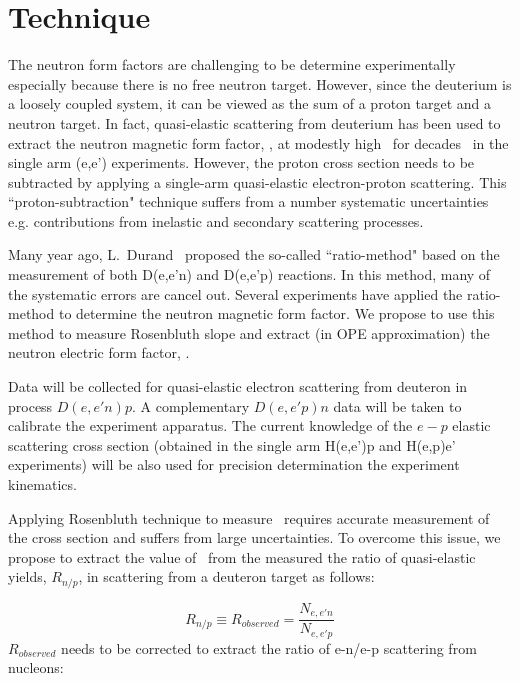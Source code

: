 \section{Technique}
%
The neutron form factors are challenging to be determine experimentally especially because there is no free neutron target. 
However, since the deuterium is a loosely coupled system, it can be viewed as the sum of a proton target and a neutron target. 
In fact, quasi-elastic scattering from deuterium has been used to extract the neutron magnetic form factor, \gmn, at modestly high \qsq~for decades~\cite{Hughes:1965zza, Arnold:1988us} in the single arm (e,e') experiments. 
However, the proton cross section needs to be subtracted by applying a single-arm quasi-elastic electron-proton scattering. 
This ``proton-subtraction" technique suffers from a number systematic uncertainties e.g. contributions from inelastic and secondary scattering processes. 

Many year ago, L.~Durand~\cite{Durand:1959zz} proposed the so-called ``ratio-method" based on the measurement of both D(e,e'n) and D(e,e'p) reactions. 
In this method, many of the systematic errors are cancel out. 
Several experiments \cite{Bruins:1995ns, Kubon:2001rj, Lachniet:2008qf} have applied the ratio-method to determine the neutron magnetic form factor. 
We propose to use this method to measure Rosenbluth slope and extract (in OPE approximation) the neutron electric form factor, \gen.

Data will be collected for quasi-elastic electron scattering from deuteron in process $D(e,e'n)p$. 
A complementary $D(e,e'p)n$ data will be taken to calibrate the experiment apparatus.
The current knowledge of the $e-p$ elastic scattering cross section (obtained in the single arm H(e,e')p and H(e,p)e' experiments) will be also used
for precision determination the experiment kinematics.

Applying Rosenbluth technique to measure \gen~requires accurate measurement of the cross section  and suffers from large uncertainties. 
To overcome this issue, we propose to extract the value of \gen~from the measured the ratio of quasi-elastic yields, $R_{n/p}$, in scattering from a deuteron target as follows: 

\begin{equation}
R_{n/p} \equiv R_{observed} = \frac{N_{e,e'n}}{N_{e,e'p}}
\label{eq:1}
\end{equation}
$R_{observed}$ needs to be corrected to extract the ratio of e-n/e-p scattering from nucleons:

